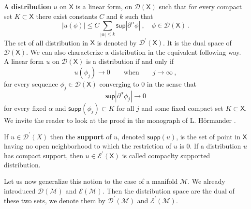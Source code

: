 \documentclass[12pt]{book}
\newcommand{\supp}{\mathsf{supp}}
\renewcommand{\sup}{\mathsf{sup}}
\newcommand{\abs}[1]{\left|#1\right|}
\newcommand{\Dcal}{\mathcal{D}}
\newcommand{\Ecal}{\mathcal{E}}
\newcommand{\Fcal}{\mathcal{F}}
\newcommand{\Mcal}{\mathcal{M}}
\newcommand{\Fsf}{\mathsf{F}}
\newcommand{\Xsf}{\mathsf{X}}
\theoremstyle{break}
\begin{document}
A \textbf{distribution} $u$ on $\Xsf$ is a linear form, on $\Dcal(\Xsf)$ such that for every compact set $K \subset \Xsf$ there exist constants $C$ and $k$ such that
%
\begin{equation*}
\abs{u(\phi)} \leq C \sum_{\abs{\alpha} \leq k} \sup \abs{\partial^\alpha \phi} \ , \quad \phi \in \Dcal(\Xsf) \ .
\end{equation*}
%
The set of all distribution in $\Xsf$ is denoted by $\Dcal^\prime(\Xsf)$. It is the dual space of $\Dcal(\Xsf)$. We can also characterize a distribution in the equivalent following way. A linear form $u$ on $\Dcal(\Xsf)$ is a distribution if and only if 
%
\begin{equation*}
u(\phi_j) \to 0 \qquad  \mbox{when} \qquad j \to \infty \ ,
\end{equation*}
%
for every sequence $\phi_j \in \Dcal(\Xsf)$ converging to $0$ in the sense that
%
\begin{equation*}
\sup\abs{\partial^\alpha\phi_j} \to 0
\end{equation*}
%
for every fixed $\alpha$ and $\supp(\phi_j) \subset K$ for all $j$ and some fixed compact set $K \subset \Xsf$. We invite the reader to look at the proof in the monograph of L. Hörmander \cite{hormander_analysis_1990}.




If $u\in\Dcal^\prime(X)$ then the \textbf{support} of $u$, denoted $\supp(u)$, is the set of point in $\Xsf$ having no open neighborhood to which the restriction of $u$ is $0$. If a distribution $u$ has compact support, then $u \in \Ecal^\prime(\Xsf)$ is called compaclty supported distribution.




Let us now generalize this notion to the case of a manifold $\Mcal$. We already introduced $\Dcal(\Mcal)$ and $\Ecal(\Mcal)$. Then the distribution space are the dual of these two sets, we denote them by $\Dcal^\prime(\Mcal)$ and $\Ecal^\prime(\Mcal)$.




%
%
\end{document}
